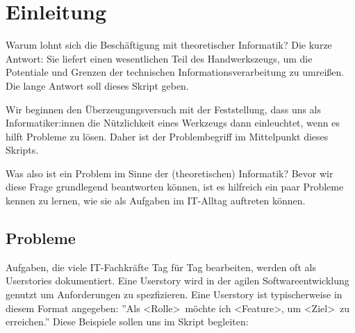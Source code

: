 \chapter{Einleitung}\label{einleitung}
Warum lohnt sich die Beschäftigung mit theoretischer Informatik?
Die kurze Antwort: Sie liefert einen wesentlichen Teil des Handwerkszeugs,
um die Potentiale und Grenzen der technischen Informationsverarbeitung zu umreißen.
Die lange Antwort soll dieses Skript geben.

Wir beginnen den Überzeugungsversuch mit der Feststellung,
dass uns als Informatiker:innen die Nützlichkeit
eines Werkzeugs dann einleuchtet, wenn es hilft Probleme zu lösen.
Daher ist der Problembegriff im Mittelpunkt dieses Skripts.

Was also ist ein Problem im Sinne der (theoretischen) Informatik?
Bevor wir diese Frage grundlegend beantworten können,
ist es hilfreich ein paar Probleme kennen zu lernen,
wie sie als Aufgaben im IT-Alltag auftreten können.

\section{Probleme}
Aufgaben, die viele IT-Fachkräfte Tag für Tag bearbeiten,
werden oft als Userstories dokumentiert.
Eine Userstory wird in der agilen Softwareentwicklung genutzt um Anforderungen zu spezfizieren.
Eine Userstory ist typischerweise in diesem Format angegeben:
''Als \textless Rolle\textgreater\ möchte ich \textless Feature\textgreater,
um \textless Ziel\textgreater\ zu erreichen.''
Diese Beispiele sollen uns im Skript begleiten:

